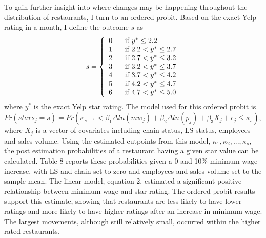 \documentclass[11pt]{article}
\begin{document}
To gain further insight into where changes may be happening throughout the distribution of restaurants, I turn to an ordered probit. Based on the exact Yelp rating in a month, I define the outcome $s$ as 
\begin{equation}
   s=\left\{
                \begin{array}{ll}
                  0 \mbox{\hspace{5mm} if } y^* \leq 2.2 \\
                 	1 \mbox{\hspace{5mm} if } 2.2<y^* \leq 2.7\\
                 2 \mbox{\hspace{5mm} if } 2.7<y^* \leq 3.2\\
                 3 \mbox{\hspace{5mm} if } 3.2<y^* \leq 3.7\\
                 4 \mbox{\hspace{5mm} if } 3.7 <y^* \leq 4.2\\
                 5 \mbox{\hspace{5mm} if } 4.2 <y^* \leq 4.7\\
                 6 \mbox{\hspace{5mm} if } 4.7 <y^* \leq 5.0\\
                \end{array}
              \right.
 \end{equation}
where $y^*$ is the exact Yelp star rating. The model used for this ordered probit is 
\begin{equation}
Pr(stars_j = s) = Pr(\kappa_{s-1} < \beta_1 \Delta ln(mw_{j}) + \beta_2 \Delta ln(p_j) + \beta_3 X_j+ \epsilon_j \leq \kappa_s),
\end{equation}
where $X_j$ is a vector of covariates including chain status, LS status, employees and sales volume. Using the estimated cutpoints from this model, $\kappa_1, \kappa_2,...,\kappa_s$, the post estimation probabilities of a restaurant having a given star value can be calculated. Table 8 reports these probabilities given a 0 and 10\% minimum wage increase, with LS and chain set to zero and employees and sales volume set to the sample mean. The linear model, equation 2, estimated a significant positive relationship between minimum wage and star rating. The ordered probit results support this estimate, showing that restaurants are less likely to have lower ratings and more likely to have higher ratings after an increase in minimum wage. The largest movements, although still relatively small, occurred within the higher rated restaurants. 
\end{document}
